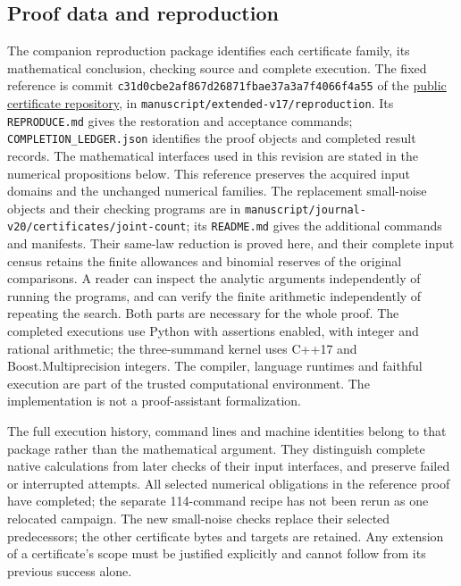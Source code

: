 \subsection{Proof data and reproduction}
\label{j:cert:reproduction}
The companion reproduction package identifies each certificate family,
its mathematical conclusion, checking source and complete execution.
The fixed reference is commit
\texttt{c31d0cbe2af867d26871fbae37a3a7f4066f4a55} of the
\href{https://github.com/kolodziejek/berry-esseen-certificates/tree/c31d0cbe2af867d26871fbae37a3a7f4066f4a55/manuscript/extended-v17/reproduction}
{public certificate repository}, in
\texttt{manuscript/extended-v17/reproduction}.
Its \texttt{REPRODUCE.md} gives the restoration and acceptance commands;
\texttt{COMPLETION\_LEDGER.json} identifies the proof objects and
completed result records. The mathematical interfaces used in this
revision are stated in the numerical propositions below.
This reference preserves the acquired input domains and the unchanged
numerical families. The replacement small-noise objects and their checking
programs are in \texttt{manuscript/journal-v20/certificates/joint-count};
its \texttt{README.md} gives the additional commands and manifests.
Their same-law reduction is proved here, and their complete input census
retains the finite allowances and binomial reserves of the original comparisons.
A reader can inspect the analytic arguments independently of running
the programs, and can verify the finite arithmetic independently of
repeating the search. Both parts are necessary for the whole proof.
The completed executions use Python with assertions enabled, with integer and rational
arithmetic; the three-summand kernel uses C++17 and
Boost.Multiprecision integers. The compiler, language runtimes and
faithful execution are part of the trusted computational environment.
The implementation is not a proof-assistant formalization.

The full execution history, command lines and machine identities belong
to that package rather than the mathematical argument. They distinguish
complete native calculations from later checks of their input
interfaces, and preserve failed or interrupted attempts. All selected
numerical obligations in the reference proof have completed; the
separate 114-command recipe has not been rerun as one relocated
campaign. The new small-noise checks replace their selected predecessors;
the other certificate bytes and targets are retained. Any extension of a
certificate's scope must be justified explicitly and cannot follow from
its previous success alone.
